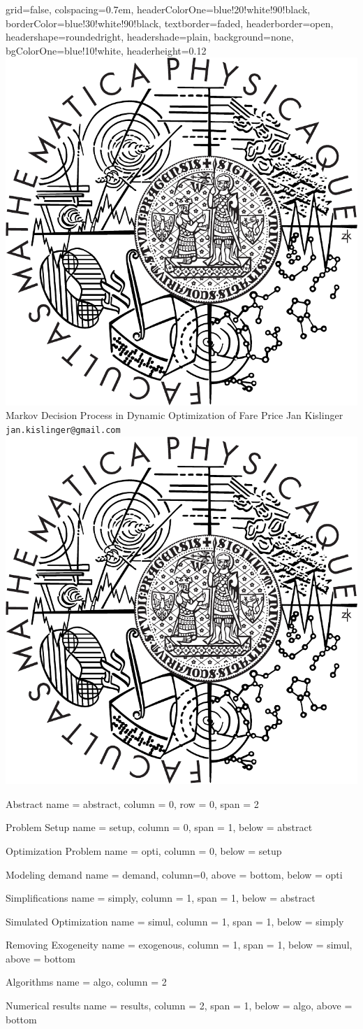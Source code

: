 \documentclass[a0paper,fontscale=0.32]{baposter} %
\begin{document}
\begin{poster}{
	 grid=false,
	 colspacing=0.7em,
	 headerColorOne=blue!20!white!90!black,
	 borderColor=blue!30!white!90!black,
	 textborder=faded,
	 headerborder=open,
	 headershape=roundedright,
	 headershade=plain,
	 background=none,
	 bgColorOne=blue!10!white,
	 headerheight=0.12\textheight
	}
	 {\includegraphics[height=0.12\textwidth]{figures/mfflogo.pdf}\\}
	 {\sc Markov Decision Process in Dynamic Optimization of Fare Price}
	 {Jan Kislinger\\[1em] {\texttt{jan.kislinger@gmail.com}}}
	 {\includegraphics[height=0.12\textwidth]{figures/mfflogo.pdf}\\}



  \headerbox
		{\large Abstract}
		{name = abstract, column = 0, row = 0, span = 2}
		{}
  
	\headerbox
		{\large Problem Setup}
		{name = setup, column = 0, span = 1, below = abstract}
		{}
  
	\headerbox
		{\large Optimization Problem}
		{name = opti, column = 0, below = setup}
		{}
  
	\headerbox
		{\large Modeling demand}
		{name = demand, column=0, above = bottom, below = opti}
		{}
  
	\headerbox
		{\large Simplifications}
		{name = simply, column = 1, span = 1, below = abstract}
		{}
		
	\headerbox
		{\large Simulated Optimization}
		{name = simul, column = 1, span = 1, below = simply}
		{}
  
	\headerbox
		{\large Removing Exogeneity}
		{name = exogenous, column = 1, span = 1, below = simul, above = bottom}
		{}
		
	\headerbox
		{\large Algorithms}
		{name = algo, column = 2}
		{}
  
	\headerbox
		{\large Numerical results}
		{name = results, column = 2, span = 1, below = algo, above = bottom}
		{}







\end{poster}%
%
\end{document}
